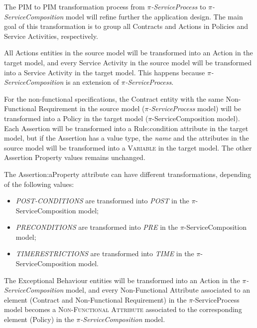 The PIM to PIM transformation process from \textit{$\pi$-ServiceProcess} to
\textit{$\pi$-ServiceComposition} model will refine further the application
design. The main goal of this transformation is to group all {\sc Contracts} and
{\sc Actions} in {\sc Policies} and {\sc Service Activities}, respectively. 


All {\sc Actions} entities in the source model will be transformed into an {\sc
Action} in the target model, and every {\sc Service Activity} in the source
model will be transformed into a {\sc Service Activity} in the target model.
This happens because \textit{$\pi$-ServiceComposition} is an extension of
\textit{$\pi$-ServiceProcess}.


For the non-functional specifications, the {\sc Contract} entity with the same
{\sc Non-Functional Requirement} in the source model
(\textit{$\pi$-ServiceProcess} model) will be transformed into a {\sc Policy} in
the target model ($\pi$-ServiceComposition model).  Each {\sc Assertion} will be
transformed into a {\sc Rule:condition} attribute in the target model, but if
the {\sc Assertion} has a value type, the \textit{name}
and the attributes in the source model will be transformed into a
\textsc{Variable} in the target model. The other {\sc Assertion
Property} values remains unchanged.



The {\sc  Assertion:aProperty} attribute can have different transformations,
depending of the following values:

\begin{itemize}
\item \textit{POST-CONDITIONS} are transformed into \textit{POST} in
the $\pi$-ServiceComposition model;
\item \textit{PRECONDITIONS} are transformed into \textit{PRE}
in the $\pi$-ServiceComposition model;
\item \textit{TIMERESTRICTIONS} are transformed into \textit{TIME}
in the $\pi$-ServiceComposition model.
\end{itemize}

The {\sc Exceptional Behaviour} entities will be
transformed into an {\sc Action} in the \textit{$\pi$-ServiceComposition} model,
and every {\sc Non-Functional Attribute} associated to an element
({\sc Contract} and {\sc Non-Functional Requirement}) in the
$\pi$-ServiceProcess model becomes a \textsc{Non-Functional Attribute}
associated to the corresponding element ({\sc Policy}) in the \textit{$\pi$-ServiceComposition}
model.

